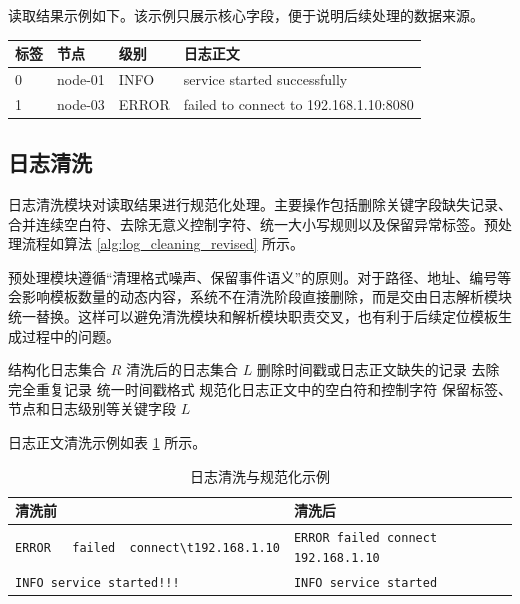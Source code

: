 读取结果示例如下。该示例只展示核心字段，便于说明后续处理的数据来源。

\begin{center}
    \begin{tabular}{p{2cm}p{2.5cm}p{2cm}p{5cm}}
        \hline
        \textbf{标签} & \textbf{节点} & \textbf{级别} & \textbf{日志正文} \\
        \hline
        0 & node-01 & INFO & service started successfully \\
        1 & node-03 & ERROR & failed to connect to 192.168.1.10:8080 \\
        \hline
    \end{tabular}
\end{center}

\subsection{日志清洗}

日志清洗模块对读取结果进行规范化处理。主要操作包括删除关键字段缺失记录、合并连续空白符、去除无意义控制字符、统一大小写规则以及保留异常标签。预处理流程如算法 \ref{alg:log_cleaning_revised} 所示。

预处理模块遵循“清理格式噪声、保留事件语义”的原则。对于路径、地址、编号等会影响模板数量的动态内容，系统不在清洗阶段直接删除，而是交由日志解析模块统一替换。这样可以避免清洗模块和解析模块职责交叉，也有利于后续定位模板生成过程中的问题。

\begin{algorithm}[htbp]
    \caption{日志清洗与规范化流程}
    \label{alg:log_cleaning_revised}
    \begin{algorithmic}[1]
        \REQUIRE 结构化日志集合 $R$
        \ENSURE 清洗后的日志集合 $L$
        \STATE 删除时间戳或日志正文缺失的记录
        \STATE 去除完全重复记录
        \STATE 统一时间戳格式
        \STATE 规范化日志正文中的空白符和控制字符
        \STATE 保留标签、节点和日志级别等关键字段
        \RETURN $L$
    \end{algorithmic}
\end{algorithm}

日志正文清洗示例如表 \ref{tab:log_cleaning_example_revised} 所示。

\begin{table}[htbp]
    \centering
    \caption{日志清洗与规范化示例}
    \label{tab:log_cleaning_example_revised}
    \begin{tabular}{p{6cm}p{6cm}}
        \hline
        \textbf{清洗前} & \textbf{清洗后} \\
        \hline
        \texttt{ERROR\ \ \ failed\ \ connect\textbackslash t192.168.1.10} & \texttt{ERROR failed connect 192.168.1.10} \\
        \texttt{INFO service started!!!} & \texttt{INFO service started} \\
        \hline
    \end{tabular}
\end{table}

